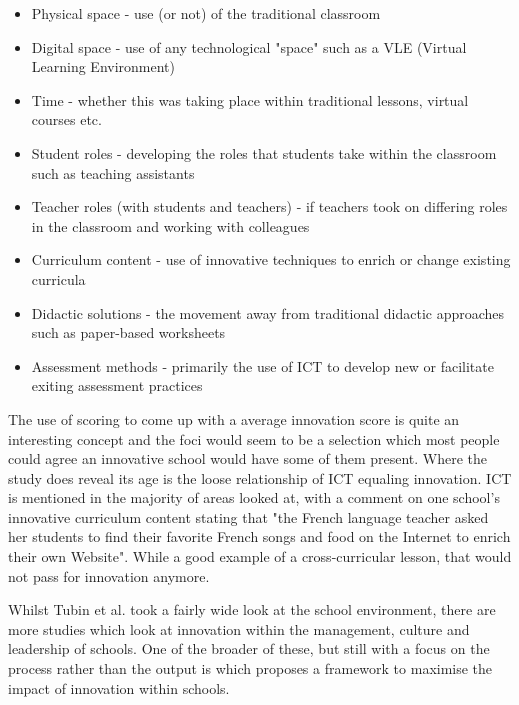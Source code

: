 \begin{itemize}
\item Physical space - use (or not) of the traditional classroom
\item Digital space - use of any technological "space" such as a VLE (Virtual Learning Environment)
\item Time - whether this was taking place within traditional lessons, virtual courses etc.
\item Student roles - developing the roles that students take within the classroom such as teaching assistants
\item Teacher roles (with students and teachers) - if teachers took on differing roles in the classroom and working with colleagues
\item Curriculum content - use of innovative techniques to enrich or change existing curricula
\item Didactic solutions - the movement away from traditional didactic approaches such as paper-based worksheets
\item Assessment methods - primarily the use of ICT to develop new or facilitate exiting assessment practices
\end{itemize}

The use of scoring to come up with a average innovation score is quite an interesting concept and the foci would seem to be a selection which most people could agree an innovative school would have some of them present. Where the study does reveal its age is the loose relationship of ICT equaling innovation. ICT is mentioned in the majority of areas looked at, with a comment on one school's innovative curriculum content stating that "the French language teacher asked her students to find their favorite French songs and food on the Internet to enrich their own Website". While a good example of a cross-curricular lesson, that would not pass for innovation anymore.

Whilst Tubin et al. took a fairly wide look at the school environment, there are more studies which look at innovation within the management, culture and leadership of schools. One of the broader of these, but still with a focus on the process rather than the output is \cite{Sharma_2005} which proposes a framework to maximise the impact of innovation within schools.
\cite{StopI4:online}